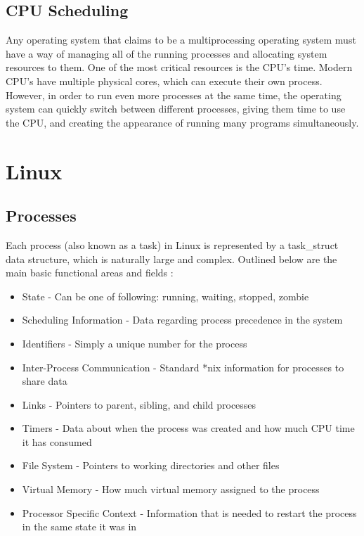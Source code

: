 \documentclass[letterpaper,draftclsnofoot,10pt,onecolumn,titlepage]{IEEEtran}\usepackage[margin=0.75in]{geometry}
\begin{document}
    \subsection{CPU Scheduling}
    Any operating system that claims to be a multiprocessing operating system must have a way of managing all of
    the running processes and allocating system resources to them. One of the most critical resources is the CPU's
    time. Modern CPU's have multiple physical cores, which can execute their own process. However, in order to run
    even more processes at the same time, the operating system can quickly switch between different processes, giving
    them time to use the CPU, and creating the appearance of running many programs simultaneously.


\section{Linux}
    \subsection{Processes}
    Each process (also known as a task) in Linux is represented by a task\_struct data structure, which is naturally
    large and complex. Outlined below are the main basic functional areas and fields \cite{linuxprocesses}:

    \begin{itemize}
        \item State - Can be one of following: running, waiting, stopped, zombie
        \item Scheduling Information - Data regarding process precedence in the system
        \item Identifiers - Simply a unique number for the process
        \item Inter-Process Communication - Standard *nix information for processes to share data
        \item Links - Pointers to parent, sibling, and child processes
        \item Timers - Data about when the process was created and how much CPU time it has consumed
        \item File System - Pointers to working directories and other files
        \item Virtual Memory - How much virtual memory assigned to the process
        \item Processor Specific Context - Information that is needed to restart the process in the same state it was in
    \end{itemize}
\end{document}
